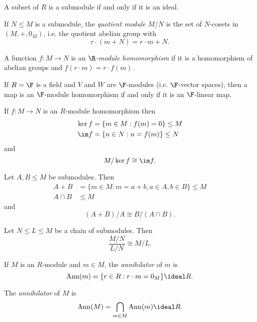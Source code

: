 \documentclass[a4paper]{article}
\theoremstyle{definition}
\DeclareMathOperator{\Ann}{Ann}
\begin{document}
\begin{eg}
  A subset of \(R\) is a submodule if and only if it is an ideal.
\end{eg}

\begin{definition}
  If \(N \leq M\) is a submodule, the \emph{quotient module} \(M/N\) is the set of \(N\)-cosets in \((M, +, 0_M)\), i.e. the quotient abelian group with
  \[
    r \cdot (m + N) = r \cdot m + N.
  \]
\end{definition}

\begin{definition}[Homomorphism]
  A function \(f: M \to N\) is an \emph{\(\R\)-module homomorphism} if it is a homomorphism of abelian groups and \(f(r \cdot m) = r \cdot f(m)\).
\end{definition}

\begin{eg}
  If \(R = \F\) is a field and \(V\) and \(W\) are \(\F\)-modules (i.e. \(\F\)-vector spaces), then a map is an \(\F\)-module homomorphism if and only if it is an \(\F\)-linear map.
\end{eg}

\begin{theorem}
  If \(f: M \to N\) is an \(R\)-module homomorphism then
  \begin{align*}
    \ker f &= \{m \in M: f(m) = 0\} \leq M \\
    \im f &= \{n \in N: n = f(m)\} \leq N
  \end{align*}
  and
  \[
    M/\ker f \cong \im f.
  \]
\end{theorem}

\begin{theorem}
  Let \(A, B \leq M\) be submodules. Then
  \begin{align*}
    A + B &= \{m \in M: m = a + b, a \in A, b \in B\} \leq M \\
    A \cap B &\leq M
  \end{align*}
  and
  \[
    (A + B)/A \cong B/(A \cap B).
  \]
\end{theorem}

\begin{theorem}
  Let \(N \leq L \leq M\) be a chain of submodules. Then
  \[
    \frac{M/N}{L/N} \cong M/L.
  \]
\end{theorem}

\begin{definition}[Annihilator]
  If \(M\) is an \(R\)-module and \(m \in M\), the \emph{annihilator} of \(m\) is
  \[
    \Ann(m) = \{r \in R: r \cdot m = 0_M\} \ideal R.
  \]

  The \emph{annihilator} of \(M\) is
  \[
    \Ann(M) = \bigcap_{m \in M} \Ann(m) \ideal R.
  \]
\end{definition}
\end{document}
